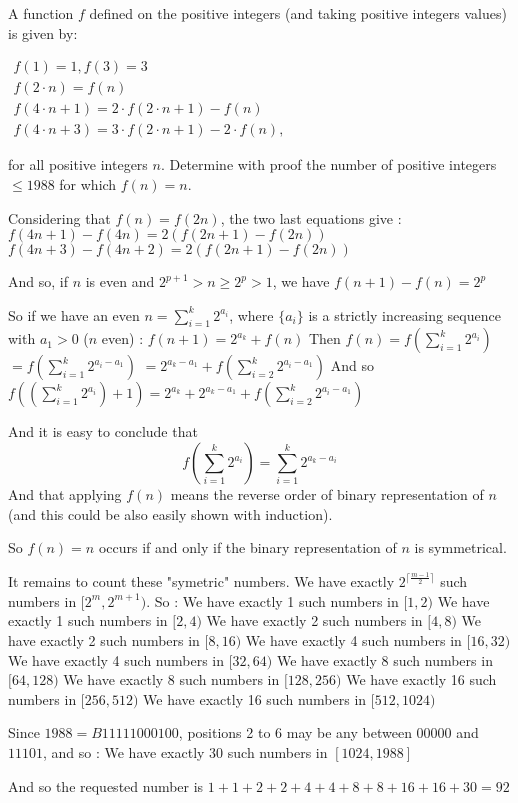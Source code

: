 \begin{mysolution}
	\begin{tcolorbox}A function $ f$ defined on the positive integers (and taking positive integers values) is given by:

$ \begin{matrix} f(1) = 1, f(3) = 3 \\
f(2 \cdot n) = f(n) \\
f(4 \cdot n + 1) = 2 \cdot f(2 \cdot n + 1) - f(n) \\
f(4 \cdot n + 3) = 3 \cdot f(2 \cdot n + 1) - 2 \cdot f(n), \end{matrix}$

for all positive integers $ n.$ Determine with proof the number of positive integers $ \leq 1988$ for which $ f(n) = n.$\end{tcolorbox}

Considering that $ f(n)=f(2n)$, the two last equations give :
$ f(4n + 1)-f(4n) = 2(f(2n + 1) - f(2n))$
$ f(4n + 3)-f(4n+2)= 2(f(2n + 1) - f(2n))$

And so, if $ n$ is even and $ 2^{p+1}>n\geq 2^p>1$, we have $ f(n+1)-f(n)=2^p$

So if we have an even $ n=\sum_{i=1}^{k} 2^{a_i}$, where $ \{a_i\}$ is a strictly increasing sequence with $ a_1>0$ ($ n$ even) : $ f(n+1)=2^{a_k}+f(n)$
Then $ f(n)=f(\sum_{i=1}^{k} 2^{a_i})$ $ =f(\sum_{i=1}^{k} 2^{a_i-a_1})$ $ =2^{a_k-a_1}+f(\sum_{i=2}^{k} 2^{a_i-a_1})$
And so $ f((\sum_{i=1}^{k} 2^{a_i})+1)=2^{a_k}+2^{a_k-a_1}+f(\sum_{i=2}^{k} 2^{a_i-a_1})$

And it is easy to conclude that \[f\left(\sum_{i=1}^{k} 2^{a_i}\right)=\sum_{i=1}^{k} 2^{a_k-a_i}\]  And that applying $ f(n)$ means the reverse order of binary representation of $n$ (and this could be also easily shown with induction).

So $ f(n)=n$ occurs if and only if the binary representation of $n$ is symmetrical.

It remains to count these "symetric" numbers. We have exactly $ 2^{\lceil\frac{m-1}{2}\rceil}$ such numbers in $ [2^m,2^{m+1})$. So :
We have exactly 1 such numbers in $ [1,2)$
We have exactly 1 such numbers in $ [2,4)$
We have exactly 2 such numbers in $ [4,8)$
We have exactly 2 such numbers in $ [8,16)$
We have exactly 4 such numbers in $ [16,32)$
We have exactly 4 such numbers in $ [32,64)$
We have exactly 8 such numbers in $ [64,128)$
We have exactly 8 such numbers in $ [128,256)$
We have exactly 16 such numbers in $ [256,512)$
We have exactly 16 such numbers in $ [512,1024)$

Since $ 1988=B11111000100$, positions 2 to 6 may be any between $ 00000$ and $ 11101$, and so :
We have exactly 30 such numbers in $ [1024,1988]$

And so the requested number is $ 1+1+2+2+4+4+8+8+16+16+30=92$
\end{mysolution}



